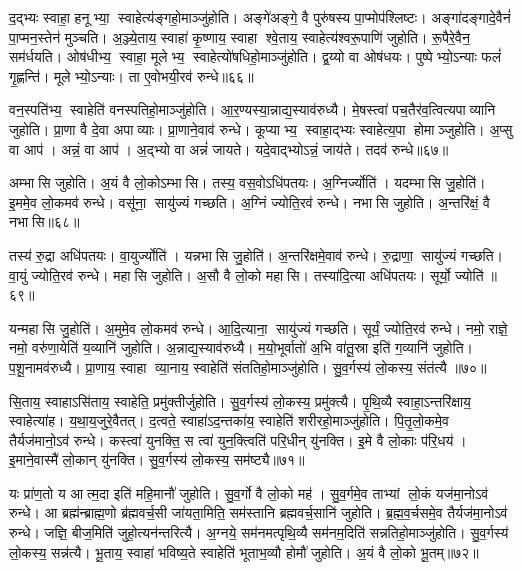 द॒द्भ्यः स्वाहा॒ हनूभ्या॒ स्वाहेत्य॑ङ्गहो॒माञ्जु॑होति। अङ्गे॑अङ्गे॒ वै पुरु॑षस्य पा॒प्मोप॑श्लिष्टः। अङ्गा॑दङ्गादे॒वैनं॑ पा॒प्मन॒स्तेन॑ मुञ्चति। अ॒ञ्ज्ये॒ताय॒ स्वाहा॑ कृ॒ष्णाय॒ स्वाहा श्वे॒ताय॒ स्वाहेत्य॑श्वरू॒पाणि॑ जुहोति। रू॒पैरे॒वैन॒ सम॑र्धयति। ओष॑धीभ्य॒ स्वाहा॒ मूलेभ्य॒ स्वाहेत्यो॑षधिहो॒माञ्जु॑होति। द्व॒य्यो वा ओष॑धयः। पुष्पेभ्यो॒ऽन्याः फलं॑ गृ॒ह्णन्ति॑। मूलेभ्यो॒ऽन्याः। ता ए॒वोभयी॒रव॑ रुन्धे॥६६॥

वन॒स्पति॑भ्य॒ स्वाहेति॑ वनस्पतिहो॒माञ्जु॑होति। आ॒र॒ण्यस्या॒न्नाद्य॒स्याव॑रुध्यै। मे॒षस्त्वा॑ पच॒तैर॑व॒त्वित्यपाव्यानि जुहोति। प्रा॒णा वै दे॒वा अपाव्याः। प्रा॒णाने॒वाव॑ रुन्धे। कूप्याभ्य॒ स्वाहा॒द्भ्यः स्वाहेत्य॒पा होमाञ्जुहोति। अ॒प्सु वा आप॑। अन्नं॒ वा आप॑। अ॒द्भ्यो वा अन्नं॑ जायते। यदे॒वाद्भ्योऽन्नं॒ जाय॑ते। तदव॑ रुन्धे॥६७॥\anuvakamend[पू॒र्व॒दी॒क्षा जु॑होति॒ पूर्व॑ ए॒व द्वि॒षन्तं॒ भ्रातृ॑व्य॒मति॑ क्राम॒त्यन॑न्तरित्यै क्रामति रुन्धे॒ जाय॑त॒ एकं॑ च]

अम्भासि जुहोति। अ॒यं वै लो॒कोऽम्भासि। तस्य॒ वस॒वोऽधि॑पतयः। अ॒ग्निर्ज्योति॑। यदम्भासि जु॒होति॑। इ॒ममे॒व लो॒कमव॑ रुन्धे। वसू॑ना॒ सायु॑ज्यं गच्छति। अ॒ग्निं ज्योति॒रव॑ रुन्धे। नभासि जुहोति। अ॒न्तरि॑क्षं॒ वै नभासि॥६८॥

तस्य॑ रु॒द्रा अधि॑पतयः। वा॒युर्ज्योति॑। यन्नभासि जु॒होति॑। अ॒न्तरि॑क्षमे॒वाव॑ रुन्धे। रु॒द्राणा॒ सायु॑ज्यं गच्छति। वा॒युं ज्योति॒रव॑ रुन्धे। महासि जुहोति। अ॒सौ वै लो॒को महासि। तस्या॑दि॒त्या अधि॑पतयः। सूर्यो॒ ज्योति॑॥६९॥

यन्महासि जु॒होति॑। अ॒मुमे॒व लो॒कमव॑ रुन्धे। आ॒दि॒त्याना॒ सायु॑ज्यं गच्छति। सूर्यं॒ ज्योति॒रव॑ रुन्धे। नमो॒ राज्ञे॒ नमो॒ वरु॑णा॒येति॑ य॒व्यानि॑ जुहोति। अ॒न्नाद्य॒स्याव॑रुध्यै। म॒यो॒भूर्वातो॑ अ॒भि वा॑तू॒स्रा इति॑ ग॒व्यानि॑ जुहोति। प॒शू॒नामव॑रुध्यै। प्रा॒णाय॒ स्वाहा व्या॒नाय॒ स्वाहेति॑ संततिहो॒माञ्जु॑होति। सु॒व॒र्गस्य॑ लो॒कस्य॒ संत॑त्यै ॥७०॥

सि॒ताय॒ स्वाहाऽसि॑ताय॒ स्वाहेति॒ प्रमु॑क्तीर्जुहोति। सु॒व॒र्गस्य॑ लो॒कस्य॒ प्रमु॑क्त्यै। पृ॒थि॒व्यै स्वाहा॒ऽन्तरि॑क्षाय॒ स्वाहेत्या॑ह। य॒था॒य॒जुरे॒वैतत्। द॒त्वते॒ स्वाहा॑ऽद॒न्तका॑य॒ स्वाहेति॑ शरीरहो॒माञ्जु॑होति। पि॒तृ॒लो॒कमे॒व तैर्यज॑मानो॒ऽव॑ रुन्धे। कस्त्वा॑ युनक्ति॒ स त्वा॑ युन॒क्त्विति॑ परि॒धीन् यु॑नक्ति। इ॒मे वै लो॒काः प॑रि॒धय॑। इ॒माने॒वास्मै॑ लो॒कान् यु॑नक्ति। सु॒व॒र्गस्य॑ लो॒कस्य॒ सम॑ष्ट्यै॥७१॥

यः प्रा॑ण॒तो य आत्म॒दा इति॑ महि॒मानौ॑ जुहोति। सु॒व॒र्गो वै लो॒को मह॑। सु॒व॒र्गमे॒व ताभ्यां लो॒कं यज॑मा॒नोऽव॑ रुन्धे। आ ब्रह्म॑न्ब्राह्म॒णो ब्र॑ह्मवर्च॒सी जा॑यता॒मिति॒ सम॑स्तानि ब्रह्मवर्च॒सानि॑ जुहोति। ब्र॒ह्म॒व॒र्चसमे॒व तैर्यज॑मा॒नोऽव॑ रुन्धे। जज्ञि॒ बीज॒मिति॑ जुहो॒त्यन॑न्तरित्यै। अ॒ग्नये॒ सम॑नमत्पृथि॒व्यै सम॑नम॒दिति॑ सन्नतिहो॒माञ्जु॑होति। सु॒व॒र्गस्य॑ लो॒कस्य॒ सन्न॑त्यै। भू॒ताय॒ स्वाहा॑ भविष्य॒ते स्वाहेति॑ भूताभ॒व्यौ होमौ॑ जुहोति। अ॒यं वै लो॒को भू॒तम्॥७२॥

